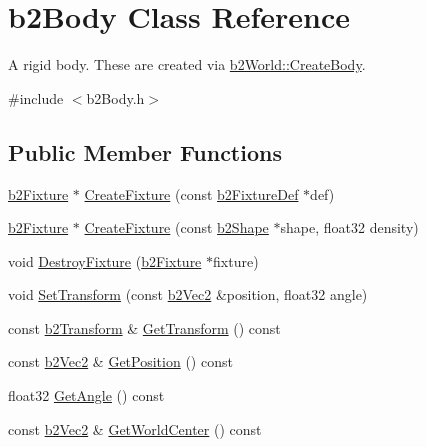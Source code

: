 \hypertarget{classb2Body}{}\section{b2\+Body Class Reference}
\label{classb2Body}


A rigid body. These are created via \mbox{\hyperlink{classb2World_a2eb36e967e43294bfa03ec3d177c2dae}{b2\+World\+::\+Create\+Body}}.  




{\ttfamily \#include $<$b2\+Body.\+h$>$}

\subsection*{Public Member Functions}
\begin{DoxyCompactItemize}
\item 
\mbox{\hyperlink{classb2Fixture}{b2\+Fixture}} $\ast$ \mbox{\hyperlink{classb2Body_aa4892301e9b9d62ede5e93dad1743894}{Create\+Fixture}} (const \mbox{\hyperlink{structb2FixtureDef}{b2\+Fixture\+Def}} $\ast$def)
\item 
\mbox{\hyperlink{classb2Fixture}{b2\+Fixture}} $\ast$ \mbox{\hyperlink{classb2Body_a52d971867086d5db79769a62bbb70a60}{Create\+Fixture}} (const \mbox{\hyperlink{classb2Shape}{b2\+Shape}} $\ast$shape, float32 density)
\item 
void \mbox{\hyperlink{classb2Body_a856d1df86b7bded91f02d8cfcaea1c2f}{Destroy\+Fixture}} (\mbox{\hyperlink{classb2Fixture}{b2\+Fixture}} $\ast$fixture)
\item 
void \mbox{\hyperlink{classb2Body_a4686f32bbce5723761e9719c706eca11}{Set\+Transform}} (const \mbox{\hyperlink{structb2Vec2}{b2\+Vec2}} \&position, float32 angle)
\item 
const \mbox{\hyperlink{structb2Transform}{b2\+Transform}} \& \mbox{\hyperlink{classb2Body_afb316448e6e555ceb2df23ed216b2f53}{Get\+Transform}} () const
\item 
const \mbox{\hyperlink{structb2Vec2}{b2\+Vec2}} \& \mbox{\hyperlink{classb2Body_a7944dc953ac0cb1e00b32bc61b50e70d}{Get\+Position}} () const
\item 
float32 \mbox{\hyperlink{classb2Body_a20b9c8d0d722edf3af281034d37bd534}{Get\+Angle}} () const
\item 
\mbox{\label{classb2Body_a3e14cfe61c63913ef7b0f719f7145318}} 
const \mbox{\hyperlink{structb2Vec2}{b2\+Vec2}} \& \mbox{\hyperlink{classb2Body_a3e14cfe61c63913ef7b0f719f7145318}{Get\+World\+Center}} () const

\end{DoxyCompactItemize}
